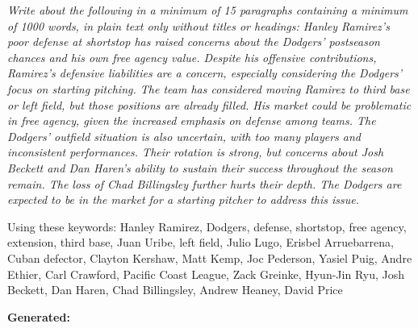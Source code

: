 {\ttfamily\em\footnotesize Write about the following in a minimum of 15 paragraphs containing a minimum of 1000 words, in plain text only without titles or headings: Hanley Ramirez's poor defense at shortstop has raised concerns about the Dodgers' postseason chances and his own free agency value. Despite his offensive contributions, Ramirez's defensive liabilities are a concern, especially considering the Dodgers' focus on starting pitching. The team has considered moving Ramirez to third base or left field, but those positions are already filled. His market could be problematic in free agency, given the increased emphasis on defense among teams. The Dodgers' outfield situation is also uncertain, with too many players and inconsistent performances. Their rotation is strong, but concerns about Josh Beckett and Dan Haren's ability to sustain their success throughout the season remain. The loss of Chad Billingsley further hurts their depth. The Dodgers are expected to be in the market for a starting pitcher to address this issue.

Using these keywords: Hanley Ramirez, Dodgers, defense, shortstop, free agency, extension, third base, Juan Uribe, left field, Julio Lugo, Erisbel Arruebarrena, Cuban defector, Clayton Kershaw, Matt Kemp, Joc Pederson, Yasiel Puig, Andre Ethier, Carl Crawford, Pacific Coast League, Zack Greinke, Hyun-Jin Ryu, Josh Beckett, Dan Haren, Chad Billingsley, Andrew Heaney, David Price
}

{\bf\ttfamily Generated: }


